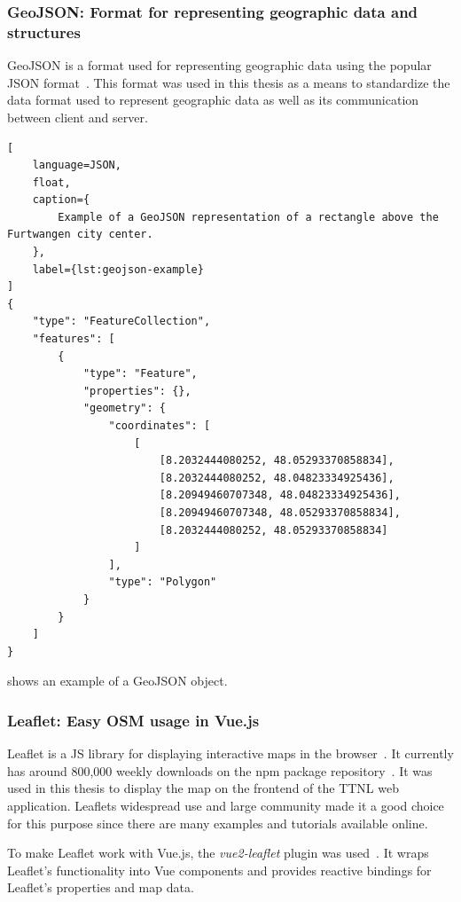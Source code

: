 \subsubsection{GeoJSON: Format for representing geographic data and structures}\label{sec:geojson}

GeoJSON is a format used for representing geographic data using the popular \ac{JSON} format~\cite{butler_geojson_2016}.
This format was used in this thesis as a means to standardize the data format used to represent geographic data as well as its communication between client and server.

\begin{lstlisting}[
    language=JSON,
    float,
    caption={
        Example of a GeoJSON representation of a rectangle above the Furtwangen city center.
    },
    label={lst:geojson-example}
]
{
    "type": "FeatureCollection",
    "features": [
        {
            "type": "Feature",
            "properties": {},
            "geometry": {
                "coordinates": [
                    [
                        [8.2032444080252, 48.05293370858834],
                        [8.2032444080252, 48.04823334925436],
                        [8.20949460707348, 48.04823334925436],
                        [8.20949460707348, 48.05293370858834],
                        [8.2032444080252, 48.05293370858834]
                    ]
                ],
                "type": "Polygon"
            }
        }
    ]
}  
\end{lstlisting}

 shows an example of a GeoJSON object.

\subsubsection{Leaflet: Easy \acl{OSM} usage in Vue.js}\label{sec:leaflet}

Leaflet is a \ac{JS} library for displaying interactive maps in the browser~\cite{volodymyr_agafonkin_leaflet_2023}.
It currently has around 800,000 weekly downloads on the npm package repository~\cite{npm_leaflet_2023}.
It was used in this thesis to display the map on the frontend of the \ac{TTNL} web application.
Leaflets widespread use and large community made it a good choice for this purpose since there are many examples and tutorials available online.

To make Leaflet work with Vue.js, the \emph{vue2-leaflet} plugin was used~\cite{vue_leaflet_team_vue_nodate}.
It wraps Leaflet's functionality into Vue components and provides reactive bindings for Leaflet's properties and map data.


